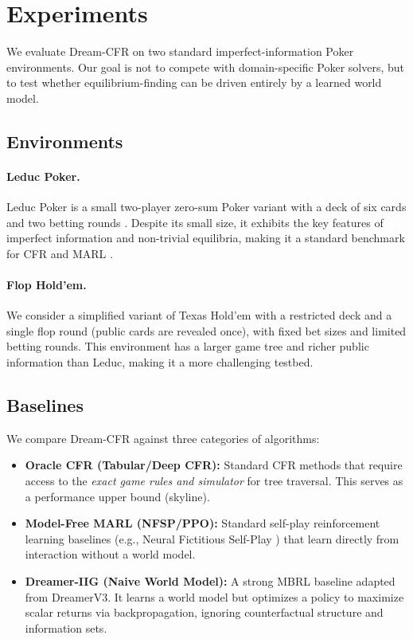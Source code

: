\documentclass{article}
\begin{document}
\section{Experiments}
\label{sec:experiments}

We evaluate Dream-CFR on two standard imperfect-information Poker environments. Our goal is not to compete with domain-specific Poker solvers, but to test whether equilibrium-finding can be driven entirely by a learned world model.

\subsection{Environments}

\paragraph{Leduc Poker.}
Leduc Poker is a small two-player zero-sum Poker variant with a deck of six cards and two betting rounds \cite{southey2005bayes}. Despite its small size, it exhibits the key features of imperfect information and non-trivial equilibria, making it a standard benchmark for CFR and MARL \cite{lanctot2017openspiel,brown2019deepcfr}.

\paragraph{Flop Hold'em.}
We consider a simplified variant of Texas Hold'em with a restricted deck and a single flop round (public cards are revealed once), with fixed bet sizes and limited betting rounds. This environment has a larger game tree and richer public information than Leduc, making it a more challenging testbed.

\subsection{Baselines}
We compare Dream-CFR against three categories of algorithms:
\begin{itemize}
    \item \textbf{Oracle CFR (Tabular/Deep CFR):} Standard CFR methods that require access to the \emph{exact game rules and simulator} for tree traversal. This serves as a performance upper bound (skyline).
    \item \textbf{Model-Free MARL (NFSP/PPO):} Standard self-play reinforcement learning baselines (e.g., Neural Fictitious Self-Play \cite{heinrich2016deep}) that learn directly from interaction without a world model.
    \item \textbf{Dreamer-IIG (Naive World Model):} A strong MBRL baseline adapted from DreamerV3. It learns a world model but optimizes a policy to maximize scalar returns via backpropagation, ignoring counterfactual structure and information sets.
\end{itemize}
\end{document}
